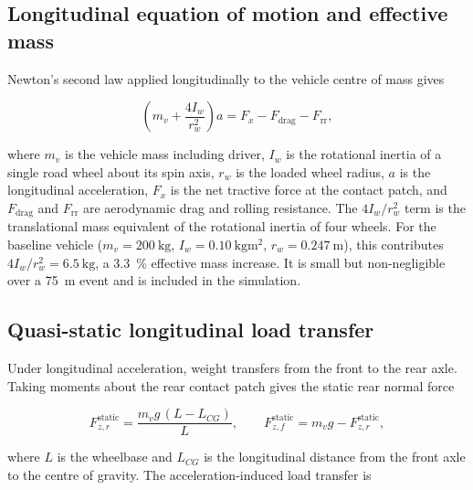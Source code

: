 \documentclass[11pt, a4paper]{report}
\numberwithin{equation}{section}
\begin{document}
\begin{refsection}
\subsection{Longitudinal equation of motion and effective mass}
\label{sec:eom}

Newton's second law applied longitudinally to the vehicle centre of
mass gives

\begin{equation}
\left(m_v + \frac{4 I_w}{r_w^2}\right) a = F_x - F_\text{drag} - F_\text{rr},
\label{eq:eom}
\end{equation}

where $m_v$ is the vehicle mass including driver, $I_w$ is the
rotational inertia of a single road wheel about its spin axis, $r_w$
is the loaded wheel radius, $a$ is the longitudinal acceleration,
$F_x$ is the net tractive force at the contact patch, and
$F_\text{drag}$ and $F_\text{rr}$ are aerodynamic drag and rolling
resistance. The $4 I_w / r_w^2$ term is the translational mass
equivalent of the rotational inertia of four wheels. For the baseline
vehicle ($m_v = \SI{200}{\kilo\gram}$,
$I_w = \SI{0.10}{\kilo\gram\metre\squared}$,
$r_w = \SI{0.247}{\metre}$), this contributes
$4 I_w / r_w^2 = \SI{6.5}{\kilo\gram}$, a \SI{3.3}{\percent}
effective mass increase. It is small but non-negligible over a
\SI{75}{\metre} event and is included in the simulation.

\subsection{Quasi-static longitudinal load transfer}
\label{sec:load_transfer}

Under longitudinal acceleration, weight transfers from the front to
the rear axle. Taking moments about the rear contact patch gives the
static rear normal force

\begin{equation}
F_{z,r}^{\text{static}} = \frac{m_v g \, (L - L_{CG})}{L},
\qquad
F_{z,f}^{\text{static}} = m_v g - F_{z,r}^{\text{static}},
\label{eq:static_normal}
\end{equation}

where $L$ is the wheelbase and $L_{CG}$ is the longitudinal distance
from the front axle to the centre of gravity. The
acceleration-induced load transfer is


\end{refsection}
\end{document}
